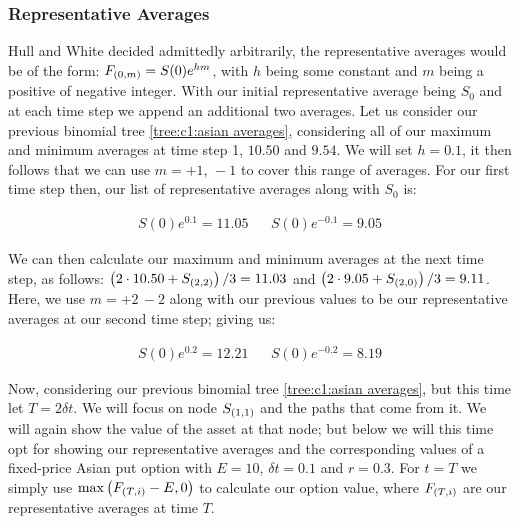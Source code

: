 \subsubsection{Representative Averages}

Hull and White decided admittedly arbitrarily, the representative averages would be of the form: \(F_{\left(0,m\right)} = S(0)e^{hm}\), with \(h\) being some constant and \(m \) being a positive of negative integer. With our initial representative average being \(S_0\) and at each time step we append an additional two averages.
\nline{}
Let us consider our previous binomial tree \autoref{tree:c1:asian averages}, considering all of our maximum and minimum averages at time step 1, \(10.50\) and \(9.54\). We will set \(h=0.1\), it then follows that we can use \(m = +1,\, -1\) to cover this range of averages. For our first time step then, our list of representative averages along with \(S_0\) is:

\begin{align*}
    S(0)e^{0.1} = 11.05 && S(0)e^{-0.1} = 9.05
\end{align*}

We can then calculate our maximum and minimum averages at the next time step, as follows: \(\left(2\cdot 10.50 +S_{\left(2,2\right)}\right)/3 = 11.03\) and \(\left(2\cdot 9.05 +S_{\left(2,0\right)}\right)/3 = 9.11\). Here, we use \(m = +2\, -2\) along with our previous values to be our representative averages at our second time step; giving us:

\begin{align*}
    S(0)e^{0.2} = 12.21 && S(0)e^{-0.2} = 8.19
\end{align*}

Now, considering our previous binomial tree \autoref{tree:c1:asian averages}, but this time let \(T = 2\delta t\). We will focus on node \(S_{\left(1,1\right)}\) and the paths that come from it. We will again show the value of the asset at that node; but below we will this time opt for showing our representative averages and the corresponding values of a fixed-price Asian put option with \(E = 10\), \(\delta t = 0.1\) and \(r = 0.3\). For \(t = T\) we simply use \(\max\left(F_{\left(T,i\right)} - E, 0\right)\) to calculate our option value, where \(F_{\left(T,i\right)} \) are our representative averages at time \(T\). 


